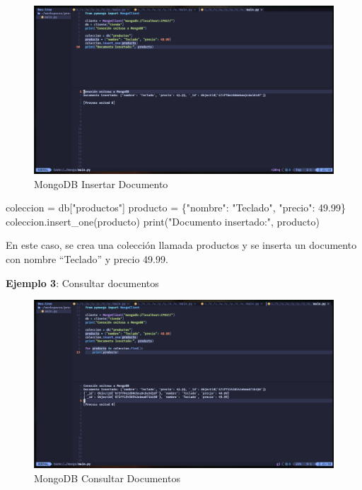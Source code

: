 \documentclass[
  a4paper,
  DIV=11,
  numbers=noendperiod,
  onepage,
  openany]{scrreprt}
\newenvironment{Shaded}{\begin{snugshade}}{\end{snugshade}}
\newcommand{\BuiltInTok}[1]{\textcolor[rgb]{0.00,0.23,0.31}{#1}}
\newcommand{\FloatTok}[1]{\textcolor[rgb]{0.68,0.00,0.00}{#1}}
\newcommand{\NormalTok}[1]{\textcolor[rgb]{0.00,0.23,0.31}{#1}}
\newcommand{\OperatorTok}[1]{\textcolor[rgb]{0.37,0.37,0.37}{#1}}
\newcommand{\StringTok}[1]{\textcolor[rgb]{0.13,0.47,0.30}{#1}}
\begin{document}
\begin{figure}[H]

{\centering \includegraphics[width=8.33333in,height=\textheight,keepaspectratio]{unidades/unidad6/./images/mongodb_code002.png}

}

\caption{MongoDB Insertar Documento}

\end{figure}%

\begin{Shaded}
\begin{Highlighting}[]
\NormalTok{coleccion }\OperatorTok{=}\NormalTok{ db[}\StringTok{"productos"}\NormalTok{]}
\NormalTok{producto }\OperatorTok{=}\NormalTok{ \{}\StringTok{"nombre"}\NormalTok{: }\StringTok{"Teclado"}\NormalTok{, }\StringTok{"precio"}\NormalTok{: }\FloatTok{49.99}\NormalTok{\}}
\NormalTok{coleccion.insert\_one(producto)}
\BuiltInTok{print}\NormalTok{(}\StringTok{"Documento insertado:"}\NormalTok{, producto)}
\end{Highlighting}
\end{Shaded}

En este caso, se crea una colección llamada productos y se inserta un
documento con nombre ``Teclado'' y precio 49.99.

\textbf{Ejemplo 3}: Consultar documentos

\begin{figure}[H]

{\centering \includegraphics[width=8.33333in,height=\textheight,keepaspectratio]{unidades/unidad6/./images/mongodb_code003.png}

}

\caption{MongoDB Consultar Documentos}

\end{figure}%
\end{document}
